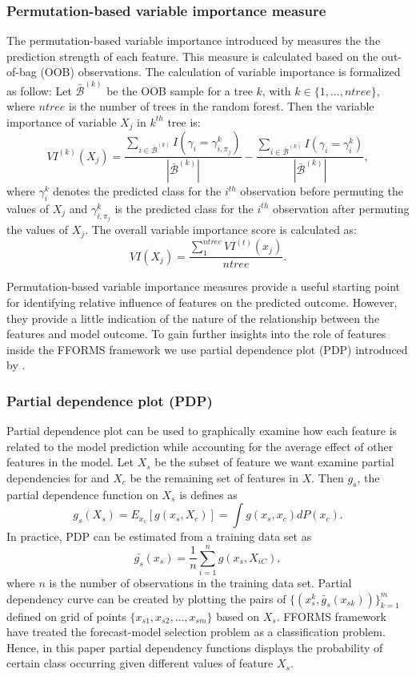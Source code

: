 \documentclass[11pt,a4paper,]{article}
\theoremstyle{definition}
\theoremstyle{definition}
\theoremstyle{definition}
\theoremstyle{remark}
\begin{document}
\subsubsection{Permutation-based variable importance
measure}\label{permutation-based-variable-importance-measure}

The permutation-based variable importance introduced by
\textcite{breiman2001random} measures the the prediction strength of
each feature. This measure is calculated based on the out-of-bag (OOB)
observations. The calculation of variable importance is formalized as
follow: Let \(\bar{\mathcal{B}}^{(k)}\) be the OOB sample for a tree
\(k\), with \(k\in \{1,...,ntree\}\), where \(ntree\) is the number of
trees in the random forest. Then the variable importance of variable
\(X_{j}\) in \(k^{th}\) tree is:
\[VI^{(k)}(X_{j})=\frac{\sum_{i\in \bar{\mathcal{B}}^{(k)}}I(\gamma_{i}=\gamma_{i,\pi_{j}}^{k})}{|\bar{\mathcal{B}}^{(k)}|}-\frac{\sum_{i\in \bar{\mathcal{B}}^{(k)}}I(\gamma_{i}=\gamma_{i}^{k})}{|\bar{\mathcal{B}}^{(k)}|},\]
where \(\gamma_{i}^{k}\) denotes the predicted class for the \(i^{th}\)
observation before permuting the values of \(X_{j}\) and
\(\gamma_{i, \pi_{j}}^{k}\) is the predicted class for the \(i^{th}\)
observation after permuting the values of \(X_{j}\). The overall
variable importance score is calculated as:
\[VI(X_{j})=\frac{\sum_{1}^{ntree}VI^{(t)}(x_{j})}{ntree}.\]

Permutation-based variable importance measures provide a useful starting
point for identifying relative influence of features on the predicted
outcome. However, they provide a little indication of the nature of the
relationship between the features and model outcome. To gain further
insights into the role of features inside the FFORMS framework we use
partial dependence plot (PDP) introduced by
\textcite{friedman2008predictive}.

\subsubsection{Partial dependence plot
(PDP)}\label{partial-dependence-plot-pdp}

Partial dependence plot can be used to graphically examine how each
feature is related to the model prediction while accounting for the
average effect of other features in the model. Let \(X_s\) be the subset
of feature we want examine partial dependencies for and \(X_c\) be the
remaining set of features in \(X\). Then \(g_s\), the partial dependence
function on \(X_s\) is defines as
\[g_s(X_s)=E_{x_c}[g(x_s, X_c)]=\int{g(x_s, x_c)dP(x_c).}\] In practice,
PDP can be estimated from a training data set as
\[\bar{g_s}(x_s)=\frac{1}{n}\sum_{i=1}^{n}g(x_s, X_{iC}),\] where \(n\)
is the number of observations in the training data set. Partial
dependency curve can be created by plotting the pairs of
\(\{(x_s^k, \bar{g}_s(x_{sk}))\}_{k=1}^{m}\) defined on grid of points
\(\{x_{s1}, x_{s2},\dots, x_{sm}\}\) based on \(X_s\). FFORMS framework
have treated the forecast-model selection problem as a classification
problem. Hence, in this paper partial dependency functions displays the
probability of certain class occurring given different values of feature
\(X_s\).
\end{document}
